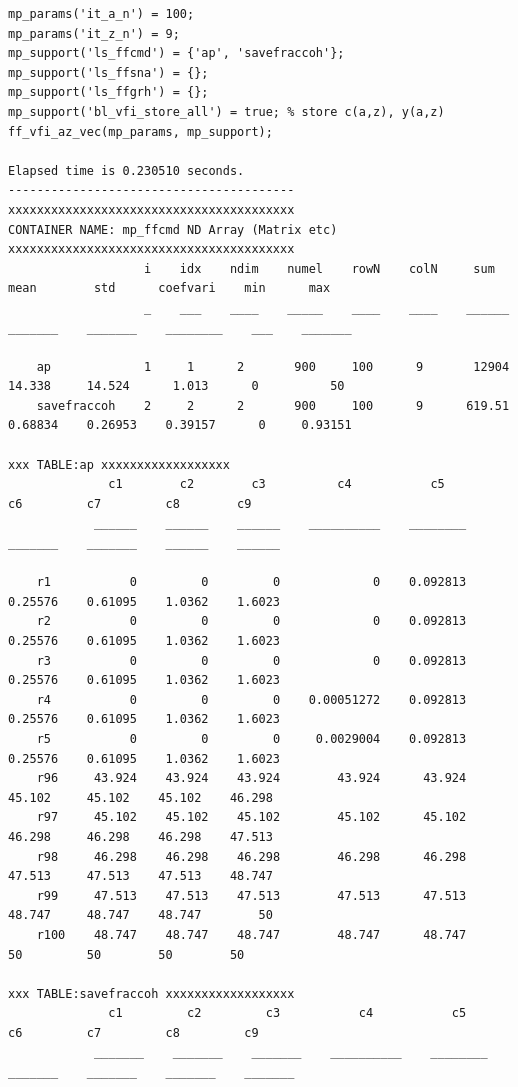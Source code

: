 \documentclass[
]{book}
\begin{document}
\begin{verbatim}
mp_params('it_a_n') = 100;
mp_params('it_z_n') = 9;
mp_support('ls_ffcmd') = {'ap', 'savefraccoh'};
mp_support('ls_ffsna') = {};
mp_support('ls_ffgrh') = {};
mp_support('bl_vfi_store_all') = true; % store c(a,z), y(a,z)
ff_vfi_az_vec(mp_params, mp_support);

Elapsed time is 0.230510 seconds.
----------------------------------------
xxxxxxxxxxxxxxxxxxxxxxxxxxxxxxxxxxxxxxxx
CONTAINER NAME: mp_ffcmd ND Array (Matrix etc)
xxxxxxxxxxxxxxxxxxxxxxxxxxxxxxxxxxxxxxxx
                   i    idx    ndim    numel    rowN    colN     sum       mean        std      coefvari    min      max  
                   _    ___    ____    _____    ____    ____    ______    _______    _______    ________    ___    _______

    ap             1     1      2       900     100      9       12904     14.338     14.524      1.013      0          50
    savefraccoh    2     2      2       900     100      9      619.51    0.68834    0.26953    0.39157      0     0.93151

xxx TABLE:ap xxxxxxxxxxxxxxxxxx
              c1        c2        c3          c4           c5         c6         c7         c8        c9  
            ______    ______    ______    __________    ________    _______    _______    ______    ______

    r1           0         0         0             0    0.092813    0.25576    0.61095    1.0362    1.6023
    r2           0         0         0             0    0.092813    0.25576    0.61095    1.0362    1.6023
    r3           0         0         0             0    0.092813    0.25576    0.61095    1.0362    1.6023
    r4           0         0         0    0.00051272    0.092813    0.25576    0.61095    1.0362    1.6023
    r5           0         0         0     0.0029004    0.092813    0.25576    0.61095    1.0362    1.6023
    r96     43.924    43.924    43.924        43.924      43.924     45.102     45.102    45.102    46.298
    r97     45.102    45.102    45.102        45.102      45.102     46.298     46.298    46.298    47.513
    r98     46.298    46.298    46.298        46.298      46.298     47.513     47.513    47.513    48.747
    r99     47.513    47.513    47.513        47.513      47.513     48.747     48.747    48.747        50
    r100    48.747    48.747    48.747        48.747      48.747         50         50        50        50

xxx TABLE:savefraccoh xxxxxxxxxxxxxxxxxx
              c1         c2         c3           c4           c5         c6         c7         c8         c9   
            _______    _______    _______    __________    ________    _______    _______    _______    _______


\end{verbatim}
\end{document}
